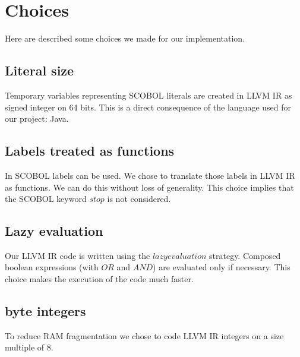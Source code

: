 \section{Choices}

Here are described some choices we made for our implementation.


\subsection{Literal size}

Temporary variables representing SCOBOL literals are created in LLVM IR as signed integer on 64 bits. This is a direct consequence of the language used for our project: Java.


\subsection{Labels treated as functions}

In SCOBOL labels can be used. We chose to translate those labels in LLVM IR as functions. We can do this without loss of generality. This choice implies that the SCOBOL keyword $stop$ is not considered.

\subsection{Lazy evaluation}

Our LLVM IR code is written using the $lazy evaluation$ strategy. Composed boolean expressions (with $OR$ and $AND$) are evaluated only if necessary. This choice makes the execution of the code much faster.

\subsection{byte integers}

To reduce RAM fragmentation we chose to code LLVM IR integers on a size multiple of 8.



